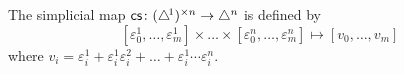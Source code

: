 %
%
%
%

%

\begin{definition}
	The simplicial map $\operatorname{\mathsf{cs}} \colon (\triangle^{\!1})^{\times n} \to \triangle^n$ is defined by
	\[
	[\varepsilon_0^1, \dots, \varepsilon_m^1]
	\times \dots \times
	[\varepsilon_0^n, \dots, \varepsilon_m^n]
	\mapsto
	[v_0, \dots, v_m]
	\]
	where $v_i = \varepsilon_i^1 + \varepsilon_i^1 \varepsilon_i^2 + \dots + \varepsilon_i^1 \dotsm \varepsilon_i^n$.
\end{definition}

